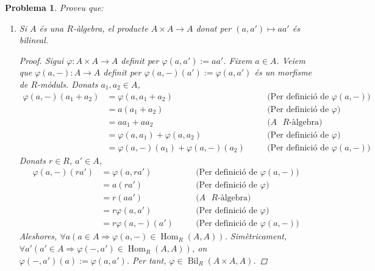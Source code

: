 \documentclass[compress]{article}
\newtheorem{problema}{Problema}
\theoremstyle{definition}
\DeclareMathOperator{\Hom}{Hom}
\DeclareMathOperator{\Bil}{Bil}
\begin{document}
\pagestyle{fancy}
\begin{problema}
     Proveu que:
     \begin{enumerate}
         \item Si $A$ és una $R$-àlgebra, el producte $A\times A\rightarrow A$ donat per $(a,a')\mapsto aa'$ és bilineal.
         \begin{proof}
             Sigui $\varphi:A\times A\rightarrow A$ definit per $\varphi(a,a'):=aa'$. Fixem $a\in A$. Veiem que $\varphi(a,-):A\rightarrow A$ definit per $\varphi(a,-)(a'):=\varphi(a,a')$ és un morfisme de $R$-mòduls. Donats $a_{1},a_{2}\in A$,
             \begin{align*}
                 \varphi(a,-)(a_{1}+a_{2})
                 &=\varphi(a,a_{1}+a_{2})
                 &\quad&\textrm{(Per definició de $\varphi(a,-)$)}\\
                 &=a(a_{1}+a_{2})
                 &\quad&\textrm{(Per definició de $\varphi$)}\\
                 &=aa_{1}+aa_{2}
                 &\quad&\textrm{($A$ $R$-àlgebra)}\\
                 &=\varphi(a,a_{1})+\varphi(a,a_{2})
                 &\quad&\textrm{(Per definició de $\varphi$)}\\
                 &=\varphi(a,-)(a_{1})+\varphi(a,-)(a_{2})
                 &\quad&\textrm{(Per definició de $\varphi(a,-)$)}
             \end{align*}
             Donats $r\in R$, $a'\in A$,
             \begin{align*}
                 \varphi(a,-)(ra')
                 &=\varphi(a,ra')
                 &\quad&\textrm{(Per definició de $\varphi(a,-)$)}\\
                 &=a(ra')
                 &\quad&\textrm{(Per definició de $\varphi$)}\\
                 &=r(aa')
                 &\quad&\textrm{($A$ $R$-àlgebra)}\\
                 &=r\varphi(a,a')
                 &\quad&\textrm{(Per definició de $\varphi$)}\\
                 &=r\varphi(a,-)(a')
                 &\quad&\textrm{(Per definició de $\varphi(a,-)$)}
             \end{align*}
             Aleshores, $\forall a(a\in A\Rightarrow\varphi(a,-)\in\Hom_{R}(A,A))$. Simètricament, $\forall a'(a'\in A\Rightarrow\varphi(-,a')\in\Hom_{R}(A,A))$, on $\varphi(-,a')(a):=\varphi(a,a')$. Per tant, $\varphi\in\Bil_{R}(A\times A,A)$.
         \end{proof}

\end{enumerate}
\end{problema}
\end{document}
